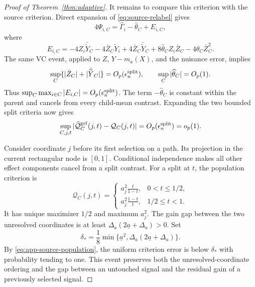 \begin{appendix}
\begin{proof}[Proof of Theorem~\ref{thm:adaptive}]
It remains to compare this criterion with the source criterion. Direct expansion
of \eqref{eq:source-relabel} gives
\[
4\Psi_{i,C}=\widehat\Gamma_i-\widehat\theta_C+E_{i,C},
\]
where
\[
E_{i,C}=-4Z_i\bar{\widetilde Y}_C-4\bar Z_C\widetilde Y_i
+4\bar Z_C\bar{\widetilde Y}_C
+8\widehat\theta_CZ_i\bar Z_C-4\widehat\theta_C\bar Z_C^2.
\]
The same VC event, applied to \(Z\), \(Y-m_a(X)\), and the nuisance error,
implies
\[
\sup_C\{|\bar Z_C|+|\bar{\widetilde Y}_C|\}
=O_p(\epsilon_n^{\rm split}),
\qquad
\sup_C|\widehat\theta_C|=O_p(1).
\]
Thus \(\sup_C\max_{i\in C}|E_{i,C}|=O_p(\epsilon_n^{\rm split})\). The term
\(-\widehat\theta_C\) is constant within the parent and cancels from every
child-mean contrast. Expanding the two bounded split criteria now gives
\begin{equation}\label{eq:app-source-population}
\sup_{C,j,t}
|\widehat{\mathcal Q}_C^{\rm grf}(j,t)-\mathcal Q_C(j,t)|
=O_p(\epsilon_n^{\rm split})=o_p(1).
\end{equation}

Consider coordinate \(j\) before its first selection on a path. Its projection in the
current rectangular node is \([0,1]\). Conditional independence makes all
other effect components cancel from a split contrast. For a split at \(t\),
the population criterion is
\begin{equation}\label{eq:app-signed-cart-shape}
\mathcal Q_C(j,t)=
\begin{cases}
\displaystyle a_j^2\frac{t}{1-t},&0<t\le1/2,\\[6pt]
\displaystyle a_j^2\frac{1-t}{t},&1/2\le t<1.
\end{cases}
\end{equation}
It has unique maximizer \(1/2\) and maximum \(a_j^2\). The gain gap between
the two unresolved coordinates is at least
\(\Delta_a(2\underline a+\Delta_a)>0\).
Set
\[
\delta_*=\frac18\min\{\underline a^2,
\Delta_a(2\underline a+\Delta_a)\}.
\]
By \eqref{eq:app-source-population}, the uniform criterion error is below
\(\delta_*\) with probability tending to one. This event preserves both the
unresolved-coordinate ordering and the gap between an untouched signal and the
residual gain of a previously selected signal.


\end{proof}
\end{appendix}
